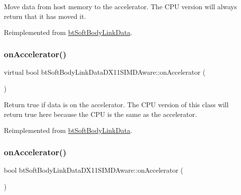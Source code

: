 Move data from host memory to the accelerator. The C\+PU version will always return that it has moved it. 

Reimplemented from \hyperlink{classbtSoftBodyLinkData_a6cce268f804d465f3bc998771d3a7433}{bt\+Soft\+Body\+Link\+Data}.

\mbox{\label{classbtSoftBodyLinkDataDX11SIMDAware_a3e740fcbea59c3d0b79f27df3fe8c40d}} 
\subsubsection{\texorpdfstring{on\+Accelerator()}{onAccelerator()}\hspace{0.1cm}{\footnotesize\ttfamily [1/2]}}
{\footnotesize\ttfamily virtual bool bt\+Soft\+Body\+Link\+Data\+D\+X11\+S\+I\+M\+D\+Aware\+::on\+Accelerator (\begin{DoxyParamCaption}{ }\end{DoxyParamCaption})\hspace{0.3cm}{\ttfamily [virtual]}}

Return true if data is on the accelerator. The C\+PU version of this class will return true here because the C\+PU is the same as the accelerator. 

Reimplemented from \hyperlink{classbtSoftBodyLinkData_ae284c2a182ddf82dde057a8c2eb17ac3}{bt\+Soft\+Body\+Link\+Data}.

\mbox{\label{classbtSoftBodyLinkDataDX11SIMDAware_acc8a4475c093d0caf3da6e104ad33f5d}} 
\subsubsection{\texorpdfstring{on\+Accelerator()}{onAccelerator()}\hspace{0.1cm}{\footnotesize\ttfamily [2/2]}}
{\footnotesize\ttfamily bool bt\+Soft\+Body\+Link\+Data\+D\+X11\+S\+I\+M\+D\+Aware\+::on\+Accelerator (\begin{DoxyParamCaption}{ }\end{DoxyParamCaption})\hspace{0.3cm}{\ttfamily [virtual]}}

